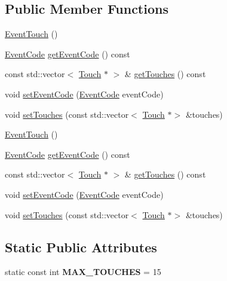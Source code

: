 \subsection*{Public Member Functions}
\begin{DoxyCompactItemize}
\item 
\hyperlink{classEventTouch_aeb38249006126c7dc9403df2f4dbf53f}{Event\+Touch} ()
\item 
\hyperlink{classEventTouch_a35816ad7349f0b7accc0a30a469b0087}{Event\+Code} \hyperlink{classEventTouch_acd18ac36408f6789e079dde77b7c8240}{get\+Event\+Code} () const
\item 
const std\+::vector$<$ \hyperlink{classTouch}{Touch} $\ast$ $>$ \& \hyperlink{classEventTouch_aa103aa7fe4e41d6abf9c08831ffac4f5}{get\+Touches} () const
\item 
void \hyperlink{classEventTouch_ac26a1793d7fdd6d6010447b02721a637}{set\+Event\+Code} (\hyperlink{classEventTouch_a35816ad7349f0b7accc0a30a469b0087}{Event\+Code} event\+Code)
\item 
void \hyperlink{classEventTouch_a19bd66fc0c1460d4064c8551afcc8bb0}{set\+Touches} (const std\+::vector$<$ \hyperlink{classTouch}{Touch} $\ast$$>$ \&touches)
\item 
\hyperlink{classEventTouch_a10238760094be14269a0e166c35c3112}{Event\+Touch} ()
\item 
\hyperlink{classEventTouch_a35816ad7349f0b7accc0a30a469b0087}{Event\+Code} \hyperlink{classEventTouch_acd18ac36408f6789e079dde77b7c8240}{get\+Event\+Code} () const
\item 
const std\+::vector$<$ \hyperlink{classTouch}{Touch} $\ast$ $>$ \& \hyperlink{classEventTouch_aa103aa7fe4e41d6abf9c08831ffac4f5}{get\+Touches} () const
\item 
void \hyperlink{classEventTouch_ac26a1793d7fdd6d6010447b02721a637}{set\+Event\+Code} (\hyperlink{classEventTouch_a35816ad7349f0b7accc0a30a469b0087}{Event\+Code} event\+Code)
\item 
void \hyperlink{classEventTouch_a19bd66fc0c1460d4064c8551afcc8bb0}{set\+Touches} (const std\+::vector$<$ \hyperlink{classTouch}{Touch} $\ast$$>$ \&touches)
\end{DoxyCompactItemize}
\subsection*{Static Public Attributes}
\begin{DoxyCompactItemize}
\item 
\mbox{\label{classEventTouch_a0707e1937e70a1d14ba2d9a53f9659fe}} 
static const int {\bfseries M\+A\+X\+\_\+\+T\+O\+U\+C\+H\+ES} = 15
\end{DoxyCompactItemize}

